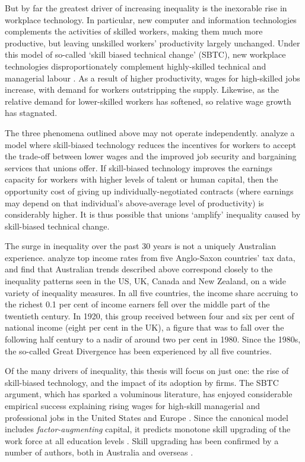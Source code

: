But by far the greatest driver of increasing inequality is the inexorable rise in workplace technology. In particular, new computer and information technologies complements the activities of skilled workers, making them much more productive, but leaving unskilled workers' productivity largely unchanged. Under this model of so-called `skill biased technical change' (SBTC), new workplace technologies disproportionately complement highly-skilled technical and managerial labour \citep{Griliches1969,Autor2006}. As a result of higher productivity, wages for high-skilled jobs increase, with demand for workers outstripping the supply. Likewise, as the relative demand for lower-skilled workers has softened, so relative wage growth has stagnated. 

The three phenomena outlined above may not operate independently. \citet{Acemoglu2003} analyze a model where skill-biased technology reduces the incentives for workers to accept the trade-off between lower wages and the improved job security and bargaining services that unions offer. If skill-biased technology improves the earnings capacity for workers with higher levels of talent or human capital, then the opportunity cost of giving up individually-negotiated contracts (where earnings may depend on that individual's above-average level of productivity) is considerably higher. It is thus possible that unions `amplify' inequality caused by skill-biased technical change.

The surge in inequality over the past 30 years is not a uniquely Australian experience. \citet{Atkinson2013} analyze top income rates from five Anglo-Saxon countries' tax data, and find that Australian trends described above correspond closely to the inequality patterns seen in the US, UK, Canada and New Zealand, on a wide variety of inequality measures. In all five countries, the income share accruing to the richest 0.1 per cent of income earners fell over the middle part of the twentieth century. In 1920, this group received between four and six per cent of national income (eight per cent in the UK), a figure that was to fall over the following half century to a nadir of around two per cent in 1980. Since the 1980s, the so-called Great Divergence has been experienced by all five countries. 

Of the many drivers of inequality, this thesis will focus on just one: the rise of skill-biased technology, and the impact of its adoption by firms. The SBTC argument, which has sparked a voluminous literature, has enjoyed considerable empirical success explaining rising wages for high-skill managerial and professional jobs in the United States and Europe \citep{Katz1992}. Since the canonical model includes \emph{factor-augmenting} capital, it predicts monotone skill upgrading of the work force at all education levels \citep{Levy2003}. Skill upgrading has been confirmed by a number of authors, both in Australia \citep{Esposto2012, Wooden2000, Cully1999} and overseas \citep{Autor2008}. 


